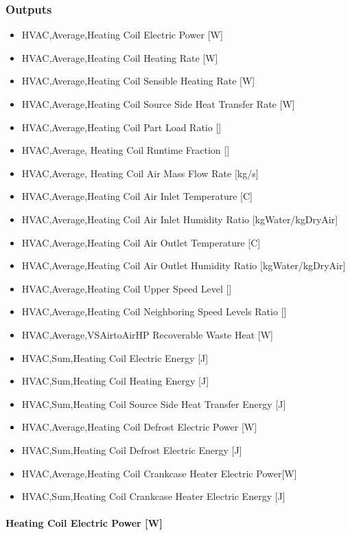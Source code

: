 \subsubsection{Outputs}\label{outputs-17}

\begin{itemize}
\item
  HVAC,Average,Heating Coil Electric Power {[}W{]}
\item
  HVAC,Average,Heating Coil Heating Rate {[}W{]}
\item
  HVAC,Average,Heating Coil Sensible Heating Rate {[}W{]}
\item
  HVAC,Average,Heating Coil Source Side Heat Transfer Rate {[}W{]}
\item
  HVAC,Average,Heating Coil Part Load Ratio {[]}
\item
  HVAC,Average, Heating Coil Runtime Fraction {[]}
\item
  HVAC,Average, Heating Coil Air Mass Flow Rate {[}kg/s{]}
\item
  HVAC,Average,Heating Coil Air Inlet Temperature {[}C{]}
\item
  HVAC,Average,Heating Coil Air Inlet Humidity Ratio {[}kgWater/kgDryAir{]}
\item
  HVAC,Average,Heating Coil Air Outlet Temperature {[}C{]}
\item
  HVAC,Average,Heating Coil Air Outlet Humidity Ratio {[}kgWater/kgDryAir{]}
\item
  HVAC,Average,Heating Coil Upper Speed Level {[]}
\item
  HVAC,Average,Heating Coil Neighboring Speed Levels Ratio {[]}
\item
  HVAC,Average,VSAirtoAirHP Recoverable Waste Heat {[}W{]}
\item
  HVAC,Sum,Heating Coil Electric Energy {[}J{]}
\item
  HVAC,Sum,Heating Coil Heating Energy {[}J{]}
\item
  HVAC,Sum,Heating Coil Source Side Heat Transfer Energy {[}J{]}
\item
  HVAC,Average,Heating Coil Defrost Electric Power {[}W{]}
\item
  HVAC,Sum,Heating Coil Defrost Electric Energy {[}J{]}
\item
  HVAC,Average,Heating Coil Crankcase Heater Electric Power{[}W{]}
\item
  HVAC,Sum,Heating Coil Crankcase Heater Electric Energy {[}J{]}
\end{itemize}

\paragraph{Heating Coil Electric Power {[}W{]}}\label{heating-coil-electric-power-w-7}

